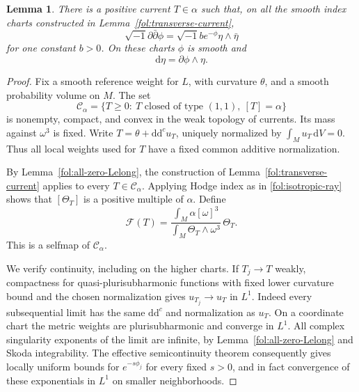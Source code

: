 \documentclass[11pt,letterpaper]{article}
\newtheorem{lemma}[theorem]{Lemma}
\theoremstyle{definition}
\theoremstyle{remark}
\begin{document}
\begin{lemma}\label{fol:fixed-point}
There is a positive current $T\in\alpha$ such that, on all the smooth
index charts constructed in Lemma~\ref{fol:transverse-current},
\begin{equation}\label{fol:fixed-point-equation}
 \sqrt{-1}\partial\bar\partial\phi
 =\sqrt{-1} b e^{-\phi}\eta\wedge\bar\eta
\end{equation}
for one constant $b>0$.  On these charts $\phi$ is smooth and
\begin{equation}\label{fol:eta-derivative}
 \mathrm{d}\eta=\partial\phi\wedge\eta.
\end{equation}
\end{lemma}

\begin{proof}
Fix a smooth reference weight for $L$, with curvature $\theta$, and a
smooth probability volume on $M$.  The set
\[
 \mathcal C_\alpha=
 \{T\geq0:\ T\text{ closed of type }(1,1),\ [T]=\alpha\}
\]
is nonempty, compact, and convex in the weak topology of currents.
Its mass against $\omega^3$ is fixed.  Write
$T=\theta+\mathrm{d}\mathrm{d}^{c} u_T$, uniquely normalized by
$\int_Mu_T\,\mathrm{d} V=0$.  Thus all local weights used for $T$ have
a fixed common additive normalization.

By Lemma~\ref{fol:all-zero-Lelong}, the construction of
Lemma~\ref{fol:transverse-current} applies to every $T\in\mathcal C_\alpha$.
Applying Hodge index as in \eqref{fol:isotropic-ray} shows that
$[\Theta_T]$ is a positive multiple of $\alpha$.  Define
\begin{equation}\label{fol:fixed-point-map}
 \mathcal F(T)=
 \frac{\int_M\alpha[\omega]^3}{\int_M\Theta_T\wedge\omega^3}\,\Theta_T.
\end{equation}
This is a selfmap of $\mathcal C_\alpha$.

We verify continuity, including on the higher charts.  If $T_j\to T$
weakly, compactness for quasi-plurisubharmonic functions with fixed lower
curvature bound and the chosen normalization gives
$u_{T_j}\to u_T$ in $L^1$.  Indeed every subsequential limit has the same
$\mathrm{d}\mathrm{d}^{c}$ and normalization as $u_T$.  On a coordinate chart the metric
weights are plurisubharmonic and converge in $L^1$.
All complex singularity exponents of the limit are infinite, by
Lemma~\ref{fol:all-zero-Lelong} and Skoda integrability.
The effective semicontinuity theorem
\cite[Theorem~0.2(2)]{DemaillyKollar} consequently gives locally uniform
bounds for $e^{-s\phi_j}$ for every fixed $s>0$, and in fact convergence
of these exponentials in $L^1$ on smaller neighborhoods.


\end{proof}
\end{document}
